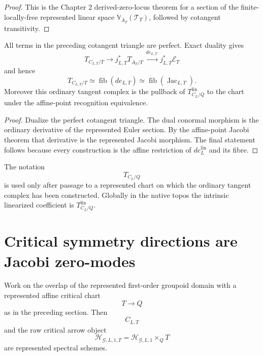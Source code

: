 \begin{proof}
This is the Chapter 2 derived-zero-locus theorem for a section of the
finite-locally-free represented linear space
$\mathbb V_{\overline A_T}(\mathcal T_T)$, followed by cotangent transitivity.
\end{proof}

\begin{theorem}
\label{thm:symmetry-noether-chartwise-ordinary-critical-tangent}
All terms in the preceding cotangent triangle are perfect.  Exact duality gives
\[
T_{C_{L,T}/T}
\longrightarrow
j_{L,T}^*T_{\overline A_T/T}
\xrightarrow{\,de_{L,T}\,}
j_{L,T}^*\mathcal E_T
\]
and hence
\[
\boxed{
T_{C_{L,T}/T}
\simeq
\operatorname{fib}(de_{L,T})
\simeq
\operatorname{fib}(\operatorname{Jac}_{L,T}).
}
\]
Moreover this ordinary tangent complex is the pullback of
$T_{C_L/Q}^{\mathrm{lin}}$ to the chart under the affine-point recognition
equivalence.
\end{theorem}

\begin{proof}
Dualize the perfect cotangent triangle.  The dual conormal morphism is the
ordinary derivative of the represented Euler section.  By the affine-point Jacobi
theorem that derivative is the represented Jacobi morphism.  The final statement
follows because every construction is the affine restriction of
$de_L^{\mathrm{lin}}$ and its fibre.
\end{proof}

\begin{convention}
\label{conv:symmetry-noether-ordinary-tangent-notation}
The notation
\[
T_{C_L/Q}
\]
is used only after passage to a represented chart on which the ordinary tangent
complex has been constructed.  Globally in the native topos the intrinsic
linearized coefficient is
$T_{C_L/Q}^{\mathrm{lin}}$.
\end{convention}

\section{Critical symmetry directions are Jacobi zero-modes}
\label{sec:symmetry-noether-critical-symmetry-directions-are-jacobi-zero-modes}

Work on the overlap of the represented first-order groupoid domain with a
represented affine critical chart
\[
T\longrightarrow Q
\]
as in the preceding section.  Then
\[
C_{L,T}
\]
and the raw critical arrow object
\[
\mathcal H_{\mathcal G,L,1,T}
=
\mathcal H_{\mathcal G,L,1}\times_QT
\]
are represented spectral schemes.

